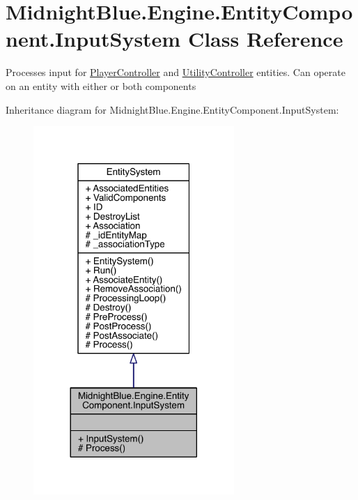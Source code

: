 \hypertarget{class_midnight_blue_1_1_engine_1_1_entity_component_1_1_input_system}{}\section{Midnight\+Blue.\+Engine.\+Entity\+Component.\+Input\+System Class Reference}
\label{class_midnight_blue_1_1_engine_1_1_entity_component_1_1_input_system}


Processes input for \hyperlink{class_midnight_blue_1_1_engine_1_1_entity_component_1_1_player_controller}{Player\+Controller} and \hyperlink{class_midnight_blue_1_1_engine_1_1_entity_component_1_1_utility_controller}{Utility\+Controller} entities. Can operate on an entity with either or both components  




Inheritance diagram for Midnight\+Blue.\+Engine.\+Entity\+Component.\+Input\+System\+:
\nopagebreak
\begin{figure}[H]
\begin{center}
\leavevmode
\includegraphics[width=216pt]{class_midnight_blue_1_1_engine_1_1_entity_component_1_1_input_system__inherit__graph}
\end{center}
\end{figure}


